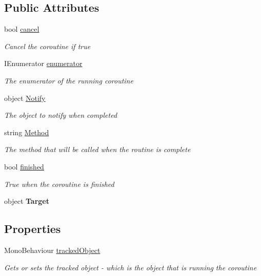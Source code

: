 \subsection*{Public Attributes}
\begin{DoxyCompactItemize}
\item 
bool \hyperlink{class_radical_routine_a6df3c3e067bcfb939c9d1b6c0e08cc9c}{cancel}
\begin{DoxyCompactList}\small\item\em Cancel the coroutine if true \end{DoxyCompactList}\item 
I\+Enumerator \hyperlink{class_radical_routine_a001dcc418773639592a9a4e1671c4e9d}{enumerator}
\begin{DoxyCompactList}\small\item\em The enumerator of the running coroutine \end{DoxyCompactList}\item 
object \hyperlink{class_radical_routine_ae35334ed495c3b720bf7f797777f12af}{Notify}
\begin{DoxyCompactList}\small\item\em The object to notify when completed \end{DoxyCompactList}\item 
string \hyperlink{class_radical_routine_a2bb230163b0827ab0c643cff9cc8523b}{Method}
\begin{DoxyCompactList}\small\item\em The method that will be called when the routine is complete \end{DoxyCompactList}\item 
bool \hyperlink{class_radical_routine_a703633102ff8fd31f582c0e18def8680}{finished}
\begin{DoxyCompactList}\small\item\em True when the coroutine is finished \end{DoxyCompactList}\item 
\mbox{\label{class_radical_routine_a6ee5e181a83dadd6d9a52a398f4b84f2}} 
object {\bfseries Target}
\end{DoxyCompactItemize}
\subsection*{Properties}
\begin{DoxyCompactItemize}
\item 
Mono\+Behaviour \hyperlink{class_radical_routine_a235e7bd6879257332c2836c021bae75e}{tracked\+Object}
\begin{DoxyCompactList}\small\item\em Gets or sets the tracked object -\/ which is the object that is running the coroutine \end{DoxyCompactList}\end{DoxyCompactItemize}
